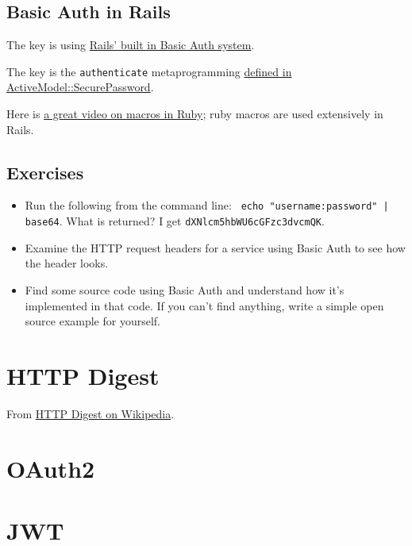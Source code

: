 \documentclass{article}
\begin{document}
\subsection{Basic Auth in Rails}

The key is using \href{https://github.com/rails/rails/blob/master/actionpack/lib/action_controller/metal/http_authentication.rb}{%
Rails' built in Basic Auth system}.

The key is the \texttt{authenticate} metaprogramming
\href{https://github.com/rails/rails/blob/master/activemodel/lib/active_model/secure_password.rb#L119}{%
  defined in ActiveModel::SecurePassword}.

Here is \href{https://www.youtube.com/watch?v=O1sgFzn_Pgk}{%
a great video on macros in Ruby}; ruby macros are used extensively in Rails.

\subsection{Exercises}

\begin{itemize}
  \item Run the following from the command line: \texttt{%
      echo "username:password" | base64}. What is returned?
    I get \texttt{dXNlcm5hbWU6cGFzc3dvcmQK}.
  \item Examine the HTTP request headers for a service using Basic Auth
    to see how the header looks.
  \item Find some source code using Basic Auth and understand how
    it's implemented in that code. If you can't find anything, write
    a simple open source example for yourself.
\end{itemize}

\section{HTTP Digest}


From \href{https://en.wikipedia.org/wiki/Digest_access_authentication}{HTTP Digest on Wikipedia}.

\section{OAuth2}


\section{JWT}
\end{document}
